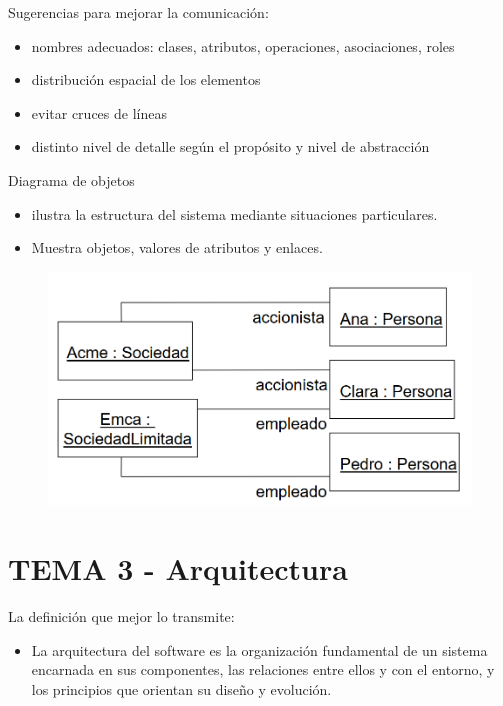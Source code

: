 \documentclass[12pt, twoside, openright]{report} %
\begin{document}
    Sugerencias para mejorar la comunicación:

    \begin{itemize}
    
    \item
      nombres adecuados: clases, atributos, operaciones, asociaciones,
      roles
    \item
      distribución espacial de los elementos
    \item
      evitar cruces de líneas
    \item
      distinto nivel de detalle según el propósito y nivel de
      abstracción
    \end{itemize}
\pagebreak
	Diagrama de objetos

    \begin{itemize}
    
    \item
      ilustra la estructura del sistema mediante situaciones
      particulares.
    \item
      Muestra objetos, valores de atributos y enlaces.
    \end{itemize}
	\begin{figure}[H]
		{\includegraphics[scale=.3]{Untitled 29.png}}
	\end{figure}
  
\chapter{TEMA 3 - Arquitectura}


La definición que mejor lo transmite:

\begin{itemize}
\item
	La arquitectura del software es la organización fundamental de un
	sistema encarnada en sus componentes, las relaciones entre ellos y
	con el entorno, y los principios que orientan su diseño y
	evolución.
\end{itemize}
\end{document}
